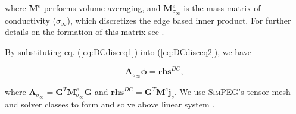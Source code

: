 \documentclass[extra,mreferee]{gji}
\newcommand{\SimPEG}{\textsc{SimPEG}\xspace}
\newcommand{\siginf}{\sigma_\infty}
\newcommand{\dgrad}{{\mathbf G}}
\newcommand{\Ace}{{\mathbf A_c^e}}
\newcommand{\diag}{\mathbf{diag}}
\newcommand{\M}{{\mathbf M}}
\newcommand{\MeSigInf}{{\M^e_{\sigma_\infty}}}
\newcommand{\Me}{{\M^e}}
\renewcommand {\dj}  { {\mathbf{j} } }
\newcommand{\vol}{\mathbf{v}}
\newcommand{\A}{\mathbf{A}}
\begin{document}
where $\mathbf{M}^e$ performs volume averaging, and $\mathbf{M}^e_{\siginf}$ is the mass matrix of conductivity ($\siginf$), which discretizes the edge based inner product.
For further details on the formation of this matrix see \cite{Eldadbook}. 

By substituting eq. (\ref{eq:DCdisceq1}) into (\ref{eq:DCdisceq2}), we have
\begin{linenomath*}
\begin{equation}
  \A_{\siginf}\boldsymbol{\phi} = \mathbf{rhs}^{DC},
  \label{eq:DCdiscLin}
\end{equation}
\end{linenomath*}
where $\A_{\siginf} = \dgrad^T \MeSigInf\dgrad$ and $\mathbf{rhs}^{DC} = \dgrad^T \Me\dj_s$. We use \SimPEG's tensor mesh and solver classes to form and solve above linear system \cite[]{Cockett2015}.

\end{document}
